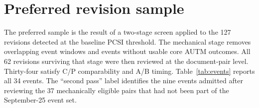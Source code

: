 \section{Preferred revision sample}\label{app:events}

The preferred sample is the result of a two-stage screen applied to the 127 revisions detected at the baseline PCSI
threshold. The mechanical stage removes overlapping event windows and events without usable core AUTM outcomes. All 62
revisions surviving that stage were then reviewed at the document-pair level. Thirty-four satisfy C/P comparability and
A/B timing. Table~\ref{tab:events} reports all 34 events. The ``second pass'' label identifies the nine events admitted
after reviewing the 37 mechanically eligible pairs that had not been part of the September-25 event set.



